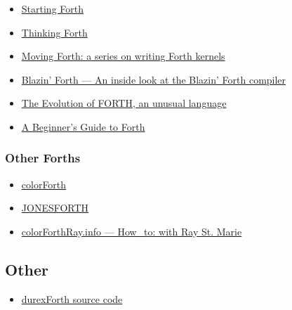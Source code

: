 \begin{itemize}
\item \href{http://www.forth.com/starting-forth/}{Starting Forth}
\item \href{http://thinking-forth.sourceforge.net/}{Thinking Forth}
\item \href{http://www.bradrodriguez.com/papers/}{Moving Forth: a series on writing Forth kernels}
\item \href{http://www.csbruce.com/~csbruce/cbm/transactor/v7/i5/p058.html}{Blazin' Forth --- An inside look at the Blazin' Forth compiler}
\item \href{http://www.drdobbs.com/architecture-and-design/the-evolution-of-forth-an-unusual-langua/228700557}{The Evolution of FORTH, an unusual language}
\item \href{http://galileo.phys.virginia.edu/classes/551.jvn.fall01/primer.htm}{A Beginner's Guide to Forth}
\end{itemize}

\subsubsection{Other Forths}

\begin{itemize}
\item \href{http://www.colorforth.com/cf.html}{colorForth}
\item \href{http://www.annexia.org/forth}{JONESFORTH}
\item \href{http://colorforthray.info/}{colorForthRay.info --- How\_to: with Ray St. Marie}
\end{itemize}

\subsection{Other}

\begin{itemize}
\item \href{https://github.com/jkotlinski/durexforth}{durexForth source code}
\end{itemize}
